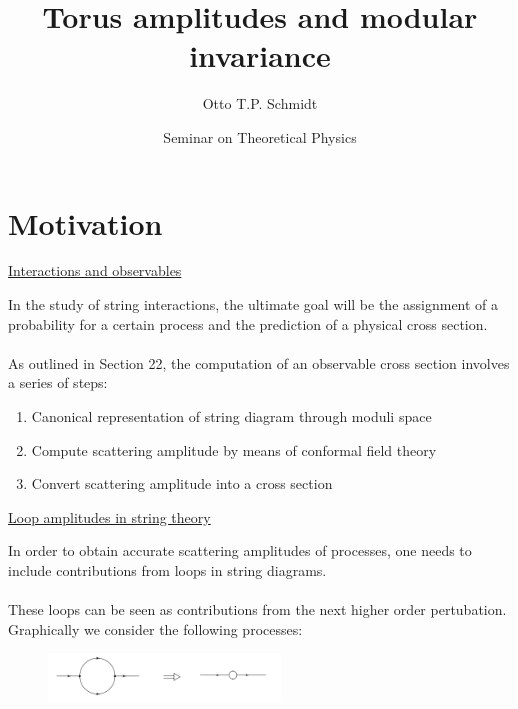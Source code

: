 \documentclass[11pt,aspectratio=169]{beamer}
\title{Torus amplitudes and modular invariance}
\date[16.5.2022]{Seminar on Theoretical Physics}
\author{Otto T.P. Schmidt}
\institute[Department of Physics]{}
\begin{document}

\titleframe



\tocframe

\section{Motivation}

\begin{frame}[fragile]{\underline{Interactions and observables}}

	In the study of string interactions, the ultimate goal will be the assignment of a probability for a certain process and the prediction of a physical cross section.
	\\~\\
	As outlined in Section 22, the computation of an observable cross section involves a series of steps:
	\begin{enumerate}
		\item Canonical representation of string diagram through moduli space
		\item Compute scattering amplitude by means of conformal field theory
		\item Convert scattering amplitude into a cross section
	\end{enumerate}
	
	
		




\end{frame}

\begin{frame}[fragile]{\underline{Loop amplitudes in string theory}}
	
	In order to obtain accurate scattering amplitudes of processes,
	one needs to include contributions from loops in string diagrams. 
	\\~\\
	These loops can be seen as contributions
	from the next higher order pertubation. 
	Graphically we consider the following processes:
	\begin{figure}[htbp]
		\centering
		\includegraphics[width = 0.55\textwidth]{elements/Feynman loop}
	\end{figure}


\end{frame}
\end{document}
